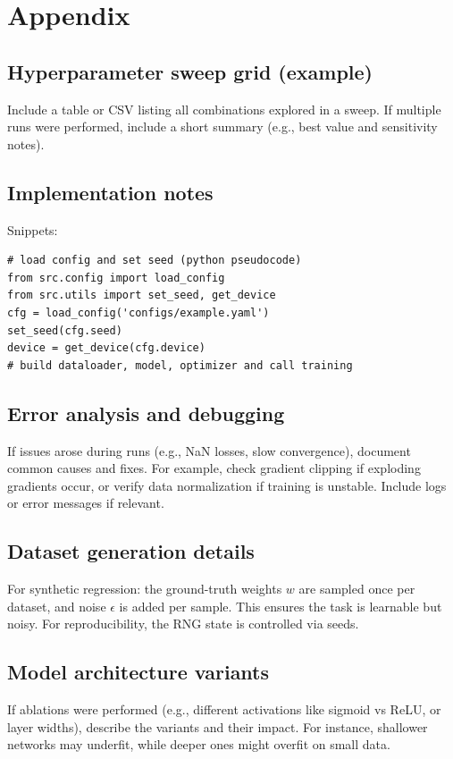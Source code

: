 \documentclass[11pt]{article}
\begin{document}
\section*{Appendix}
\subsection*{Hyperparameter sweep grid (example)}
Include a table or CSV listing all combinations explored in a sweep. If multiple runs were performed, include a short summary (e.g., best value and sensitivity notes).

\subsection*{Implementation notes}
Snippets:
\begin{verbatim}
# load config and set seed (python pseudocode)
from src.config import load_config
from src.utils import set_seed, get_device
cfg = load_config('configs/example.yaml')
set_seed(cfg.seed)
device = get_device(cfg.device)
# build dataloader, model, optimizer and call training
\end{verbatim}

\subsection*{Error analysis and debugging}
If issues arose during runs (e.g., NaN losses, slow convergence), document common causes and fixes. For example, check gradient clipping if exploding gradients occur, or verify data normalization if training is unstable. Include logs or error messages if relevant.

\subsection*{Dataset generation details}
For synthetic regression: the ground-truth weights $w$ are sampled once per dataset, and noise $\epsilon$ is added per sample. This ensures the task is learnable but noisy. For reproducibility, the RNG state is controlled via seeds.

\subsection*{Model architecture variants}
If ablations were performed (e.g., different activations like sigmoid vs ReLU, or layer widths), describe the variants and their impact. For instance, shallower networks may underfit, while deeper ones might overfit on small data.
\end{document}
